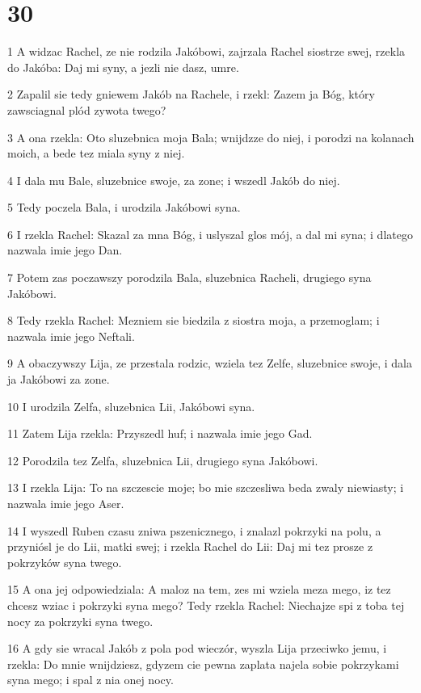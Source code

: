 \chapter{30}

\par 1 A widzac Rachel, ze nie rodzila Jakóbowi, zajrzala Rachel siostrze swej, rzekla do Jakóba: Daj mi syny, a jezli nie dasz, umre.
\par 2 Zapalil sie tedy gniewem Jakób na Rachele, i rzekl: Zazem ja Bóg, który zawsciagnal plód zywota twego?
\par 3 A ona rzekla: Oto sluzebnica moja Bala; wnijdzze do niej, i porodzi na kolanach moich, a bede tez miala syny z niej.
\par 4 I dala mu Bale, sluzebnice swoje, za zone; i wszedl Jakób do niej.
\par 5 Tedy poczela Bala, i urodzila Jakóbowi syna.
\par 6 I rzekla Rachel: Skazal za mna Bóg, i uslyszal glos mój, a dal mi syna; i dlatego nazwala imie jego Dan.
\par 7 Potem zas poczawszy porodzila Bala, sluzebnica Racheli, drugiego syna Jakóbowi.
\par 8 Tedy rzekla Rachel: Mezniem sie biedzila z siostra moja, a przemoglam; i nazwala imie jego Neftali.
\par 9 A obaczywszy Lija, ze przestala rodzic, wziela tez Zelfe, sluzebnice swoje, i dala ja Jakóbowi za zone.
\par 10 I urodzila Zelfa, sluzebnica Lii, Jakóbowi syna.
\par 11 Zatem Lija rzekla: Przyszedl huf; i nazwala imie jego Gad.
\par 12 Porodzila tez Zelfa, sluzebnica Lii, drugiego syna Jakóbowi.
\par 13 I rzekla Lija: To na szczescie moje; bo mie szczesliwa beda zwaly niewiasty; i nazwala imie jego Aser.
\par 14 I wyszedl Ruben czasu zniwa pszenicznego, i znalazl pokrzyki na polu, a przyniósl je do Lii, matki swej; i rzekla Rachel do Lii: Daj mi tez prosze z pokrzyków syna twego.
\par 15 A ona jej odpowiedziala: A maloz na tem, zes mi wziela meza mego, iz tez chcesz wziac i pokrzyki syna mego? Tedy rzekla Rachel: Niechajze spi z toba tej nocy za pokrzyki syna twego.
\par 16 A gdy sie wracal Jakób z pola pod wieczór, wyszla Lija przeciwko jemu, i rzekla: Do mnie wnijdziesz, gdyzem cie pewna zaplata najela sobie pokrzykami syna mego; i spal z nia onej nocy.
